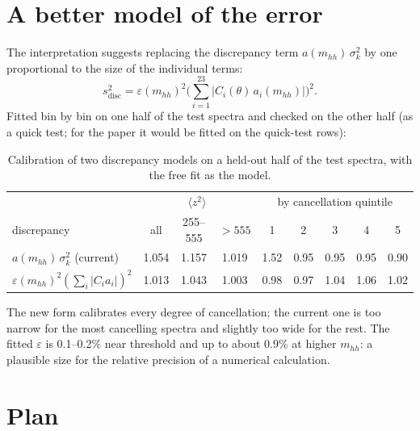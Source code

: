\section{A better model of the error}
\label{sec:better}

The interpretation suggests replacing the discrepancy term $a(m_{hh})\,\sigma_k^2$ by one
proportional to the size of the individual terms:
\begin{equation}
  s_\text{disc}^2 = \varepsilon(m_{hh})^2 \Big(\sum_{i=1}^{23} |C_i(\theta)\,a_i(m_{hh})|\Big)^2 .
\end{equation}
Fitted bin by bin on one half of the test spectra and checked on the other half (as a quick
test; for the paper it would be fitted on the quick-test rows):

\begin{table}[h]
\centering
\small
\begin{tabular}{lcccccccc}
\toprule
 & \multicolumn{3}{c}{$\langle z^2\rangle$} & \multicolumn{5}{c}{by cancellation quintile} \\
discrepancy & all & 255--555 & $>555$ & 1 & 2 & 3 & 4 & 5 \\
\midrule
$a(m_{hh})\,\sigma_k^2$ (current) & 1.054 & 1.157 & 1.019 & 1.52 & 0.95 & 0.95 & 0.95 & 0.90 \\
$\varepsilon(m_{hh})^2(\sum_i|C_ia_i|)^2$ & 1.013 & 1.043 & 1.003 & 0.98 & 0.97 & 1.04 & 1.06 & 1.02 \\
\bottomrule
\end{tabular}
\caption{Calibration of two discrepancy models on a held-out half of the test spectra, with
the free fit as the model.}
\label{tab:better}
\end{table}

The new form calibrates every degree of cancellation; the current one is too narrow for the
most cancelling spectra and slightly too wide for the rest. The fitted $\varepsilon$ is
0.1--0.2\% near threshold and up to about 0.9\% at higher $m_{hh}$: a plausible size for the
relative precision of a numerical calculation.

\section{Plan}


